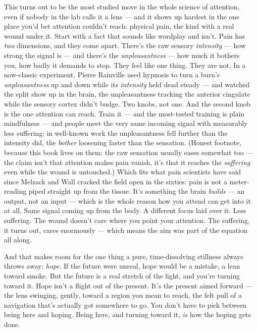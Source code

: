 \documentclass[11pt,openany]{book}
\begin{document}
This turns out to be the most studied move in the whole science of attention, even if nobody in the lab calls it a lens — and it shows up hardest in the one place you’d bet attention couldn’t reach: physical pain, the kind with a real wound under it. Start with a fact that sounds like wordplay and isn’t. Pain has \textit{two} dimensions, and they come apart. There’s the raw sensory \textit{intensity} — how strong the signal is — and there’s the \textit{unpleasantness} — how much it bothers you, how badly it demands to stop. They feel like one thing. They are not. In a now-classic experiment, Pierre Rainville used hypnosis to turn a burn’s \textit{unpleasantness} up and down while its \textit{intensity} held dead steady — and watched the split show up in the brain, the unpleasantness tracking the anterior cingulate while the sensory cortex didn’t budge. Two knobs, not one. And the second knob is the one attention can reach. Train it — and the most-tested training is plain mindfulness — and people meet the very same incoming signal with measurably less suffering: in well-known work the unpleasantness fell further than the intensity did, the \textit{bother} loosening faster than the sensation. (Honest footnote, because this book lives on them: the raw sensation usually eases somewhat too — the claim isn’t that attention makes pain vanish, it’s that it reaches the \textit{suffering} even while the wound is untouched.) Which fits what pain scientists have said since Melzack and Wall cracked the field open in the sixties: pain is not a meter-reading piped straight up from the tissue. It’s something the brain \textit{builds} — an output, not an input — which is the whole reason how you attend can get into it at all. Same signal coming up from the body. A different focus laid over it. Less suffering. The wound doesn’t care where you point your attention. The suffering, it turns out, cares enormously — which means the aim was part of the equation all along.

And that makes room for the one thing a pure, time-dissolving stillness always throws away: \textit{hope.} If the future were unreal, hope would be a mistake, a lean toward smoke. But the future is a real stretch of the light, and you’re turning toward it. Hope isn’t a flight out of the present. It’s the present aimed forward — the lens swinging, gently, toward a region you mean to reach, the felt pull of a navigation that’s actually got somewhere to go. You don’t have to pick between being here and hoping. Being here, and turning toward it, \textit{is} how the hoping gets done.
\end{document}
